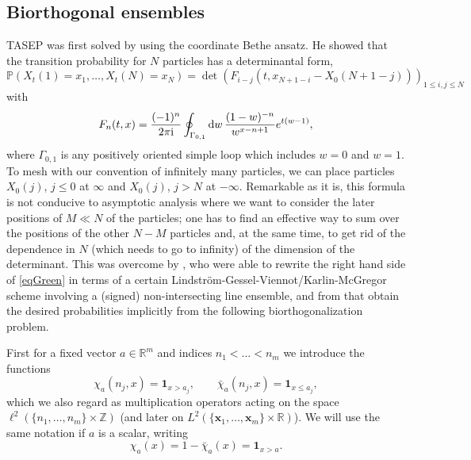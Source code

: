 \documentclass[letterpaper,reqno,11pt,oneside,final]{amsart}
\theoremstyle{definition}
\newcommand{\I}{\uptext{i}}
\newcommand{\pp}{\mathbb{P}}
\newcommand{\rr}{\mathbb{R}}
\newcommand{\zz}{\mathbb{Z}}
\newcommand{\uno}[1]{\mathbf{1}_{#1}}
\newcommand{\uptext}[1]{\text{\upshape{#1}}}
\renewcommand{\d}{\mathrm{d}}
\newcommand{\fx}{\mathbf{x}}
\numberwithin{equation}{section}
\begin{document}
\subsection{Biorthogonal ensembles}
\label{subsec:bioth}

TASEP was first solved by \citet{MR1468391} using the coordinate Bethe ansatz.   
He showed that the transition probability for $N$ particles has a determinantal form,
\begin{equation}\label{eqGreen}
\pp (X_t( 1)= x_1,\ldots,X_t(N)=x_N)=\det(F_{i-j}(t,x_{N+1-i}-X_0(N+1-j)))_{1\leq i,j\leq N}
\end{equation}
with
\begin{equation}\label{eqFn}
F_{n}(t,x)=\frac{(-1)^n}{2\pi \I} \oint_{\Gamma_{0,1}} \d w\,\frac{(1-w)^{-n}}{w^{x-n+1}}e^{t(w-1)},
\end{equation}
where $\Gamma_{0,1}$ is any positively oriented simple loop which includes $w=0$ and $w=1$.
To mesh with our convention of infinitely many particles, we can place particles $X_0(j)$, $j\le 0$ at $\infty$ and $X_0(j)$, $j>N$ at $-\infty$.
Remarkable as it is, this formula is not conducive to asymptotic analysis where we want to consider the later positions of $M\ll N$ of the particles; one has to find an effective way to sum over the positions of the other $N-M$ particles and, at the same time, to get rid of the dependence in $N$ (which needs to go to infinity) of the dimension of the determinant.
This was overcome by \cite{sasamoto,borFerPrahSasam}, who were able to rewrite the right hand side of \eqref{eqGreen} in terms of a certain Lindstr\"om-Gessel-Viennot/Karlin-McGregor scheme \cite{karlinMcGregor,gesselViennot} involving a (signed) non-intersecting line ensemble, and from that obtain the desired probabilities implicitly from the following biorthogonalization problem.

First for a fixed vector $a\in\rr^m$ and indices $n_1<\dotsc<n_m$ we introduce the functions
\begin{equation}\label{eq:defChis}
\chi_a(n_j,x)=\uno{x>a_j},\qquad\bar\chi_a(n_j,x)=\uno{x\leq a_j},
\end{equation}
which we also regard as multiplication operators acting on the space $\ell^2(\{n_1,\dotsc,n_m\}\times\zz)$ (and later on $L^2(\{\fx_1,\dotsc,\fx_m\}\times\rr)$).
We will use the same notation if $a$ is a scalar, writing 
\begin{equation}\label{eq:defChisScalar}
\chi_a(x)=1-\bar\chi_a(x)=\uno{x>a}.
\end{equation}
\end{document}
